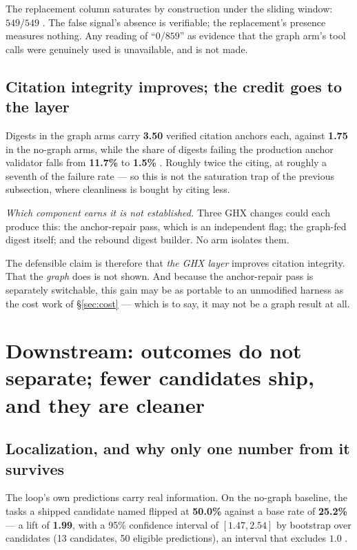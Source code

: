 The replacement column saturates by construction under the sliding window:
$549/549$ . The false signal's absence is verifiable; the
replacement's presence measures nothing. Any reading of
``$0/859$'' as evidence that the graph arm's tool calls were genuinely used
is unavailable, and is not made.

\subsection*{Citation integrity improves; the credit goes to the layer}

Digests in the graph arms carry \textbf{3.50} verified citation anchors
each, against \textbf{1.75} in the no-graph arms, while the share of
digests failing the production anchor validator falls from \textbf{11.7\%}
to \textbf{1.5\%} . Roughly twice the citing, at roughly a seventh of
the failure rate --- so this is not the saturation trap of the previous
subsection, where cleanliness is bought by citing less.

\emph{Which component earns it is not established.} Three GHX changes could
each produce this: the anchor-repair pass, which is an independent flag;
the graph-fed digest itself; and the rebound digest builder. No arm
isolates them.

The defensible claim is therefore that \emph{the GHX layer} improves
citation integrity. That the \emph{graph} does is not shown. And because
the anchor-repair pass is separately switchable, this gain may be as
portable to an unmodified harness as the cost work of
\S\ref{sec:cost} --- which is to say, it may not be a graph result at all.

\section{Downstream: outcomes do not separate; fewer candidates ship, and
they are cleaner}
\label{sec:localization}

\subsection*{Localization, and why only one number from it survives}

The loop's own predictions carry real information. On the no-graph
baseline, the tasks a shipped candidate named flipped at \textbf{50.0\%}
against a base rate of \textbf{25.2\%} --- a lift of \textbf{1.99}, with a
95\% confidence interval of $[1.47, 2.54]$ by bootstrap over candidates (13
candidates, 50 eligible predictions), an interval that excludes $1.0$
.

